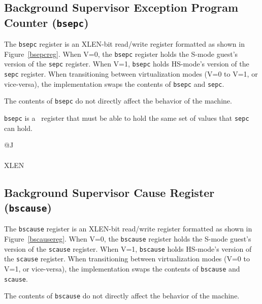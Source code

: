 \subsection{Background Supervisor Exception Program Counter ({\tt bsepc})}

The {\tt bsepc} register is an XLEN-bit read/write register formatted as shown
in Figure~\ref{bsepcreg}.  When V=0, the {\tt bsepc} register holds the
S-mode guest's version of the {\tt sepc} register.  When V=1, {\tt bsepc}
holds HS-mode's version of the {\tt sepc} register.  When transitioning between
virtualization modes (V=0 to V=1, or vice-versa), the implementation swaps the
contents of {\tt bsepc} and {\tt sepc}.

The contents of {\tt bsepc} do not directly affect the behavior of
the machine.

{\tt bsepc} is a \warl\ register that must be able to hold the same set of
values that {\tt sepc} can hold.

\begin{figure*}[h!]
{\footnotesize
\begin{center}
\begin{tabular}{@{}J}
 \\
\hline
{} \\
\hline
XLEN \\
\end{tabular}
\end{center}
}
\vspace{-0.1in}
\caption{Background supervisor exception program counter ({\tt bsepc}).}
\label{bsepcreg}
\end{figure*}

\subsection{Background Supervisor Cause Register ({\tt bscause})}

The {\tt bscause} register is an XLEN-bit read/write register formatted as shown
in Figure~\ref{bscausereg}.  When V=0, the {\tt bscause} register holds the
S-mode guest's version of the {\tt scause} register.  When V=1, {\tt bscause}
holds HS-mode's version of the {\tt scause} register.  When transitioning between
virtualization modes (V=0 to V=1, or vice-versa), the implementation swaps the
contents of {\tt bscause} and {\tt scause}.

The contents of {\tt bscause} do not directly affect the behavior of
the machine.

